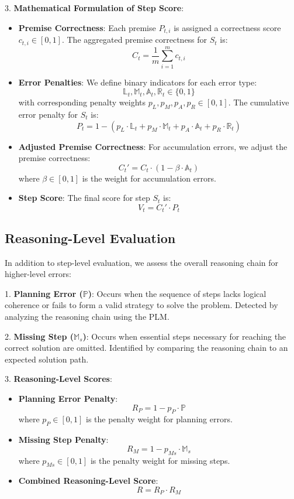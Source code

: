3. \textbf{Mathematical Formulation of Step Score}:
   \begin{itemize}
       \item \textbf{Premise Correctness}:  
       Each premise \( P_{t,i} \) is assigned a correctness score \( c_{t,i} \in [0, 1] \). The aggregated premise correctness for \( S_t \) is:
       \[
       C_t = \frac{1}{m} \sum_{i=1}^m c_{t,i}
       \]

       \item \textbf{Error Penalties}:  
       We define binary indicators for each error type:
       \[
       \mathbb{L}_t, \mathbb{M}_t, \mathbb{A}_t, \mathbb{R}_t \in \{0, 1\}
       \]
       with corresponding penalty weights \( p_L, p_M, p_A, p_R \in [0, 1] \). The cumulative error penalty for \( S_t \) is:
       \[
       P_t = 1 - \left( p_L \cdot \mathbb{L}_t + p_M \cdot \mathbb{M}_t + p_A \cdot \mathbb{A}_t + p_R \cdot \mathbb{R}_t \right)
       \]

       \item \textbf{Adjusted Premise Correctness}:  
       For accumulation errors, we adjust the premise correctness:
       \[
       C_t' = C_t \cdot (1 - \beta \cdot \mathbb{A}_t)
       \]
       where \( \beta \in [0, 1] \) is the weight for accumulation errors.

       \item \textbf{Step Score}:  
       The final score for step \( S_t \) is:
       \[
       V_t = C_t' \cdot P_t
       \]
   \end{itemize}

\subsection*{Reasoning-Level Evaluation}

In addition to step-level evaluation, we assess the overall reasoning chain for higher-level errors:

1. \textbf{Planning Error (\( \mathbb{P} \))}:  
   Occurs when the sequence of steps lacks logical coherence or fails to form a valid strategy to solve the problem. Detected by analyzing the reasoning chain using the PLM.

2. \textbf{Missing Step (\( \mathbb{M}_s \))}:  
   Occurs when essential steps necessary for reaching the correct solution are omitted. Identified by comparing the reasoning chain to an expected solution path.

3. \textbf{Reasoning-Level Scores}:
   \begin{itemize}
       \item \textbf{Planning Error Penalty}:
       \[
       R_P = 1 - p_P \cdot \mathbb{P}
       \]
       where \( p_P \in [0, 1] \) is the penalty weight for planning errors.

       \item \textbf{Missing Step Penalty}:
       \[
       R_M = 1 - p_{Ms} \cdot \mathbb{M}_s
       \]
       where \( p_{Ms} \in [0, 1] \) is the penalty weight for missing steps.

       \item \textbf{Combined Reasoning-Level Score}:
       \[
       R = R_P \cdot R_M
       \]
   \end{itemize}

